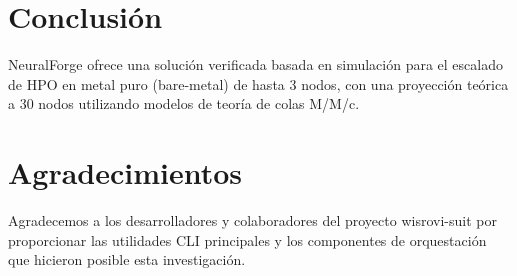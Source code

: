\documentclass[conference]{IEEEtran}
\begin{document}
\section{Conclusión}
NeuralForge ofrece una solución verificada basada en simulación para el escalado de HPO en metal puro (bare-metal) de hasta 3 nodos, con una proyección teórica a 30 nodos utilizando modelos de teoría de colas M/M/c.

\section*{Agradecimientos}
Agradecemos a los desarrolladores y colaboradores del proyecto wisrovi-suit por proporcionar las utilidades CLI principales y los componentes de orquestación que hicieron posible esta investigación.



\end{document}
